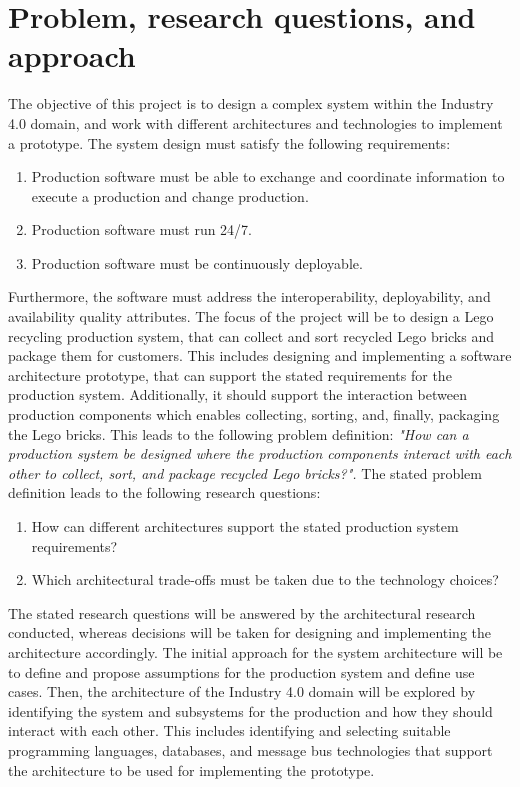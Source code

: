 \section{Problem, research questions, and approach}

The objective of this project is to design a complex system within the Industry 4.0 domain, and work with different architectures and technologies to implement a prototype. The system design must satisfy the following requirements: \linebreak

\begin{enumerate}
    \item Production software must be able to exchange and coordinate information to execute a production and change production.
    \item Production software must run 24/7.
    \item Production software must be continuously deployable.
\end{enumerate}

Furthermore, the software must address the interoperability, deployability, and availability quality attributes.
The focus of the project will be to design a Lego recycling production system, that can collect and sort recycled Lego bricks and package them for customers. This includes designing and implementing a software architecture prototype, that can support the stated requirements for the production system. Additionally, it should support the interaction between production components which enables collecting, sorting, and, finally, packaging the Lego bricks. This leads to the following problem definition:
\textit{"How can a production system be designed where the production components interact with each other to collect, sort, and package recycled Lego bricks?".}
The stated problem definition leads to the following research questions:
\begin{enumerate}
    \item How can different architectures support the stated production system requirements?
    \item Which architectural trade-offs must be taken due to the technology choices?
\end{enumerate}

The stated research questions will be answered by the architectural research conducted, whereas decisions will be taken for designing and implementing the architecture accordingly.
The initial approach for the system architecture will be to define and propose assumptions for the production system and define use cases. Then, the architecture of the Industry 4.0 domain will be explored by identifying the system and subsystems for the production and how they should interact with each other. This includes identifying and selecting suitable programming languages, databases, and message bus technologies that support the architecture to be used for implementing the prototype.








